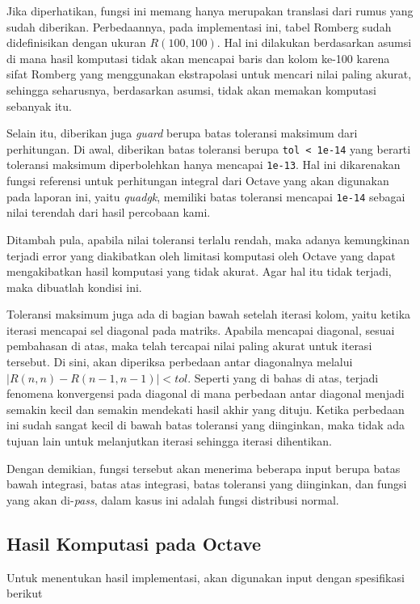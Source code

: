 \documentclass[journal,12pt,onecolumn,a4paper]{IEEEtran}
\begin{document}
Jika diperhatikan, fungsi ini memang hanya merupakan translasi dari rumus yang sudah diberikan. Perbedaannya, pada implementasi ini, tabel Romberg sudah didefinisikan dengan ukuran \(R(100,100)\). Hal ini dilakukan berdasarkan asumsi di mana hasil komputasi tidak akan mencapai baris dan kolom ke-100 karena sifat Romberg yang menggunakan ekstrapolasi untuk mencari nilai paling akurat, sehingga seharusnya, berdasarkan asumsi, tidak akan memakan komputasi sebanyak itu.

Selain itu, diberikan juga \emph{guard} berupa batas toleransi maksimum dari perhitungan. Di awal, diberikan batas toleransi berupa \lstinline{tol < 1e-14} yang berarti toleransi maksimum diperbolehkan hanya mencapai \lstinline{1e-13}. Hal ini dikarenakan fungsi referensi untuk perhitungan integral dari Octave yang akan digunakan pada laporan ini, yaitu \emph{quadgk}, memiliki batas toleransi mencapai \lstinline{1e-14} sebagai nilai terendah dari hasil percobaan kami.

Ditambah pula, apabila nilai toleransi terlalu rendah, maka adanya kemungkinan terjadi error yang diakibatkan oleh limitasi komputasi oleh Octave yang dapat mengakibatkan hasil komputasi yang tidak akurat. Agar hal itu tidak terjadi, maka dibuatlah kondisi ini.

Toleransi maksimum juga ada di bagian bawah setelah iterasi kolom, yaitu ketika iterasi mencapai sel diagonal pada matriks. Apabila mencapai diagonal, sesuai pembahasan di atas, maka telah tercapai nilai paling akurat untuk iterasi tersebut. Di sini, akan diperiksa perbedaan antar diagonalnya melalui \(|R(n,n)-R(n-1,n-1)| < tol\). Seperti yang di bahas di atas, terjadi fenomena konvergensi pada diagonal di mana perbedaan antar diagonal menjadi semakin kecil dan semakin mendekati hasil akhir yang dituju. Ketika perbedaan ini sudah sangat kecil di bawah batas toleransi yang diinginkan, maka tidak ada tujuan lain untuk melanjutkan iterasi sehingga iterasi dihentikan.

Dengan demikian, fungsi tersebut akan menerima beberapa input berupa batas bawah integrasi, batas atas integrasi, batas toleransi yang diinginkan, dan fungsi yang akan di-\emph{pass}, dalam kasus ini adalah fungsi distribusi normal.

\subsection{Hasil Komputasi pada Octave}

Untuk menentukan hasil implementasi, akan digunakan input dengan spesifikasi berikut
\end{document}
